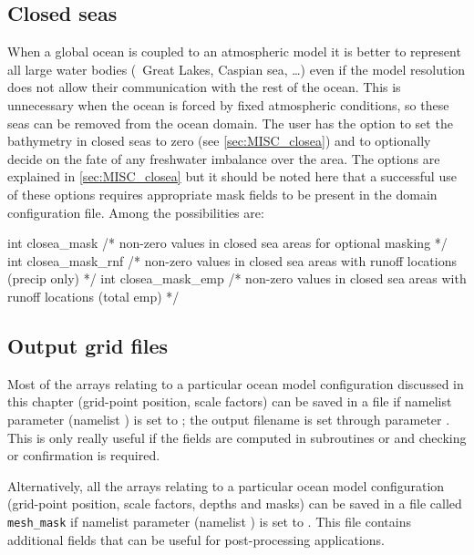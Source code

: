 \documentclass[../main/NEMO_manual]{subfiles}
\begin{document}
\subsection{Closed seas}
\label{subsec:DOM_closea}

When a global ocean is coupled to an atmospheric model it is better to
represent all large water bodies (\eg\ Great Lakes, Caspian sea, \dots) even if
the model resolution does not allow their communication with the rest of the ocean.
This is unnecessary when the ocean is forced by fixed atmospheric conditions,
so these seas can be removed from the ocean domain.
The user has the option to
set the bathymetry in closed seas to zero (see \autoref{sec:MISC_closea}) and to
optionally decide on the fate of any freshwater imbalance over the area.
The options are explained in \autoref{sec:MISC_closea} but
it should be noted here that a successful use of these options requires
appropriate mask fields to be present in the domain configuration file.
Among the possibilities are:

\begin{forlines}
int closea_mask     /* non-zero values in closed sea areas for optional masking                */
int closea_mask_rnf /* non-zero values in closed sea areas with runoff locations (precip only) */
int closea_mask_emp /* non-zero values in closed sea areas with runoff locations (total emp)   */
\end{forlines}

\subsection{Output grid files}
\label{subsec:DOM_meshmask}

Most of the arrays relating to a particular ocean model configuration discussed in this chapter
(grid-point position, scale factors) can be saved in a file if
namelist parameter  (namelist ) is set to
;
the output filename is set through parameter .
This is only really useful if
the fields are computed in subroutines  or  and
checking or confirmation is required.

Alternatively, all the arrays relating to a particular ocean model configuration
(grid-point position, scale factors, depths and masks) can be saved in
a file called \texttt{mesh\_mask} if
namelist parameter  (namelist ) is set to
.
This file contains additional fields that can be useful for post-processing applications.
\end{document}
